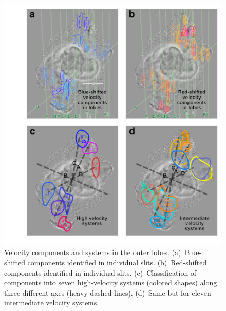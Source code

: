 \documentclass[useAMS, usenatbib]{mnras}
\begin{document}
\begin{figure}
  \centering
  \includegraphics[width=\linewidth]{figs/turtle-lobes-simplified}
  \caption{
    Velocity components and systems in the outer lobes.
    (a)~Blue-shifted components identified in individual slits.
    (b)~Red-shifted components identified in individual slits.
    (c)~Classification of components into seven high-velocity systems (colored shapes)
    along three different axes (heavy dashed lines).
    (d)~Same but for eleven intermediate velocity systems.
  }
  \label{fig:outer-lobe-components}
\end{figure}
\newcommand\Sys[1]{%
  \setcounter{Syscounter}{#1}%
  \ensuremath{\mathrm{\Roman{Syscounter}}}%
}
\newcommand\SysP[1]{\ensuremath{\Sys{#1}^+}}
\newcommand\SysM[1]{\ensuremath{\Sys{#1}^-}}
\end{document}
